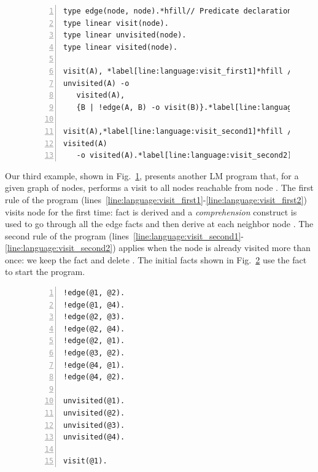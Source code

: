
\begin{figure}[h!]
\begin{Verbatim}[numbers=left,fontsize=\codesize,commandchars=\*\[\]]
type edge(node, node).*hfill// Predicate declaration
type linear visit(node).
type linear unvisited(node).
type linear visited(node).

visit(A), *label[line:language:visit_first1]*hfill // Rule 1: visit node
unvisited(A) -o
   visited(A),
   {B | !edge(A, B) -o visit(B)}.*label[line:language:visit_first2]*label[line:language:visit_comprehension]

visit(A),*label[line:language:visit_second1]*hfill // Rule 2: node already visited
visited(A)
   -o visited(A).*label[line:language:visit_second2]
\end{Verbatim}
  \label{code:language:visit}
\end{figure}

Our third example, shown in Fig.~\ref{code:language:visit}, presents another LM
program that, for a given graph of nodes, performs a visit to all nodes
reachable from node . The first rule of the program
(lines~\ref{line:language:visit_first1}-\ref{line:language:visit_first2}) visits
node  for the first time: fact  is derived and a
\emph{comprehension} construct is used to go through all the edge facts and then
derive  at each neighbor node . The second rule of the
program
(lines~\ref{line:language:visit_second1}-\ref{line:language:visit_second2})
applies when the node is already visited more than once: we keep the
 fact and delete . The initial facts shown in
Fig.~\ref{code:language:visit_initial} use the  fact to start
the program.

\begin{figure}[h!]
\begin{Verbatim}[numbers=left,fontsize=\codesize,commandchars=\*\[\]]
!edge(@1, @2).
!edge(@1, @4).
!edge(@2, @3).
!edge(@2, @4).
!edge(@2, @1).
!edge(@3, @2).
!edge(@4, @1).
!edge(@4, @2).

unvisited(@1).
unvisited(@2).
unvisited(@3).
unvisited(@4).

visit(@1).
\end{Verbatim}
  \label{code:language:visit_initial}
\end{figure}

